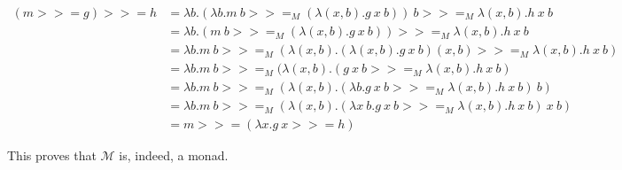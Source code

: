 \begin{equation} \label{monLaw3}
\begin{split}
(m >>= g) >>= h
 & = \lambda b. (\lambda b. m\ b >>=_M (\lambda (x, b). g\ x\ b))\ b >>=_M \lambda (x, b). h\ x\ b\\
 & = \lambda b. (m\ b >>=_M (\lambda (x, b). g\ x\ b)) >>=_M \lambda (x, b). h\ x\ b\\
 & = \lambda b. m\ b >>=_M (\lambda (x, b). (\lambda (x, b). g\ x\ b) (x, b) >>=_M \lambda (x, b). h\ x\ b)\\
 & = \lambda b. m\ b >>=_M (\lambda (x, b). (g\ x\ b >>=_M \lambda (x, b). h\ x\ b)\\
 & = \lambda b. m\ b >>=_M (\lambda (x, b). (\lambda b. g\ x\ b >>=_M \lambda (x, b). h\ x\ b)\ b)\\
 & = \lambda b. m\ b >>=_M (\lambda (x, b). (\lambda x\ b. g\ x\ b >>=_M \lambda (x, b). h\ x\ b)\ x\ b)\\
 & = m >>= (\lambda x. g\ x >>= h)
\end{split}
\end{equation}

This proves that $\mathcal{M}$ is, indeed, a monad.
